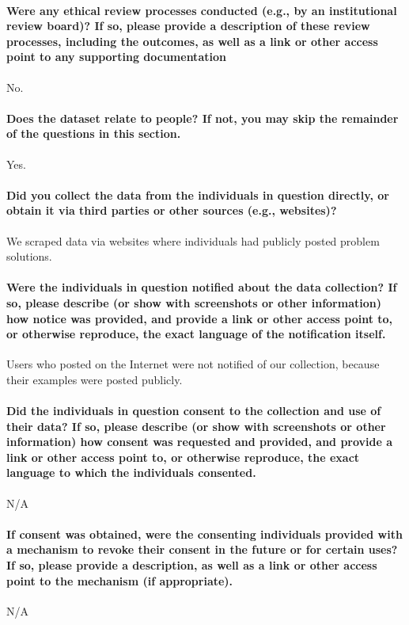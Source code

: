 \documentclass{article}
\begin{document}
\paragraph{Were any ethical review processes conducted (e.g., by an institutional review board)? If so, please provide a description of these review
processes, including the outcomes, as well as a link or other access point
to any supporting documentation}
No.

\paragraph{Does the dataset relate to people? If not, you may skip the remainder
of the questions in this section.}
Yes.

\paragraph{Did you collect the data from the individuals in question directly,
or obtain it via third parties or other sources (e.g., websites)?}
We scraped data via websites where individuals had publicly posted problem solutions.

\paragraph{Were the individuals in question notified about the data collection? If so, please describe (or show with screenshots or other information) how notice was provided, and provide a link or other access point to, or otherwise reproduce, the exact language of the notification itself.}
Users who posted on the Internet were not notified of our collection, because their examples were posted publicly.

\paragraph{Did the individuals in question consent to the collection and use
of their data? If so, please describe (or show with screenshots or other
information) how consent was requested and provided, and provide a
link or other access point to, or otherwise reproduce, the exact language
to which the individuals consented.}
N/A

\paragraph{If consent was obtained, were the consenting individuals provided with a mechanism to revoke their consent in the future or
for certain uses? If so, please provide a description, as well as a link or
other access point to the mechanism (if appropriate).}
N/A
\end{document}
